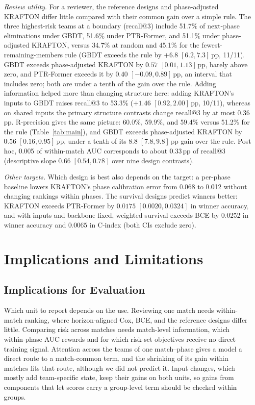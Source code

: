\documentclass[sigconf,anonymous]{acmart}
\begin{document}
\emph{Review utility.} For a reviewer, the reference designs and phase-adjusted KRAFTON differ little compared with their common gain over a simple rule. The three highest-risk teams at a boundary (recall@3) include 51.7\% of next-phase eliminations under GBDT, 51.6\% under PTR-Former, and 51.1\% under phase-adjusted KRAFTON, versus 34.7\% at random and 45.1\% for the fewest-remaining-members rule (GBDT exceeds the rule by $+6.8$ $[6.2,\allowbreak 7.3]$\,pp, 11/11). GBDT exceeds phase-adjusted KRAFTON by $0.57$ $[0.01,\allowbreak 1.13]$\,pp, barely above zero, and PTR-Former exceeds it by $0.40$ $[-0.09,\allowbreak 0.89]$\,pp, an interval that includes zero; both are under a tenth of the gain over the rule. Adding information helped more than changing structure here: adding KRAFTON's inputs to GBDT raises recall@3 to 53.3\% ($+1.46$ $[0.92,\allowbreak 2.00]$\,pp, 10/11), whereas on shared inputs the primary structure contrasts change recall@3 by at most 0.36\,pp. R-precision gives the same picture: 60.0\%, 59.9\%, and 59.4\% versus 51.2\% for the rule (Table~\ref{tab:main}), and GBDT exceeds phase-adjusted KRAFTON by $0.56$ $[0.16,\allowbreak 0.95]$\,pp, under a tenth of its $8.8$ $[7.8,\allowbreak 9.8]$\,pp gain over the rule. Post hoc, 0.005 of within-match AUC corresponds to about 0.33\,pp of recall@3 (descriptive slope 0.66 $[0.54,\allowbreak 0.78]$ over nine design contrasts).

\emph{Other targets.} Which design is best also depends on the target: a per-phase baseline lowers KRAFTON's phase calibration error from 0.068 to 0.012 without changing rankings within phases. The survival designs predict winners better: KRAFTON exceeds PTR-Former by $0.0175$ $[0.0020,\allowbreak 0.0324]$ in winner accuracy, and with inputs and backbone fixed, weighted survival exceeds BCE by $0.0252$ in winner accuracy and $0.0065$ in C-index (both CIs exclude zero).

\section{Implications and Limitations}
\label{sec:discussion}
\subsection{Implications for Evaluation}
\label{sec:discussion:implications}
Which unit to report depends on the use. Reviewing one match needs within-match ranking, where horizon-aligned Cox, BCE, and the reference designs differ little. Comparing risk across matches needs match-level information, which within-phase AUC rewards and for which risk-set objectives receive no direct training signal. Attention across the teams of one match--phase gives a model a direct route to a match-common term, and the shrinking of its gain within matches fits that route, although we did not predict it. Input changes, which mostly add team-specific state, keep their gains on both units, so gains from components that let scores carry a group-level term should be checked within groups.
\end{document}
